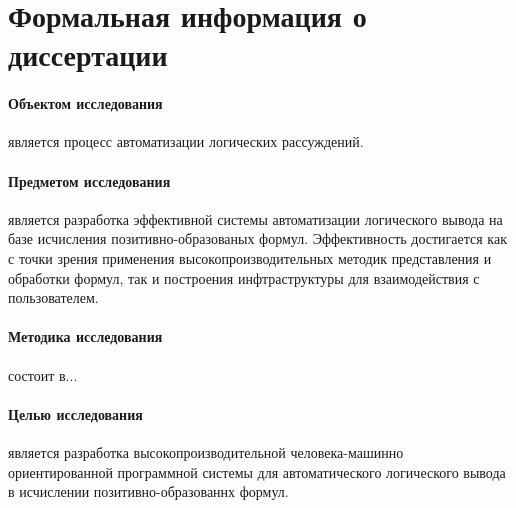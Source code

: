 \section{Формальная информация о диссертации}


\paragraph{Объектом исследования}\hspace{-1em} является процесс автоматизации логических рассуждений.

\paragraph{Предметом исследования}\hspace{-1em} является разработка эффективной системы автоматизации логического вывода на базе исчисления позитивно-образованых формул. Эффективность достигается как с точки зрения применения высокопроизводительных методик представления и обработки формул, так и построения инфтраструктуры для взаимодействия с пользователем.

\paragraph{Методика исследования}\hspace{-1em} состоит в...

\paragraph{Целью исследования}\hspace{-1em} является разработка высокопроизводительной человека-машинно ориентированной программной системы для автоматического логического вывода в исчислении позитивно-образованнх формул.

